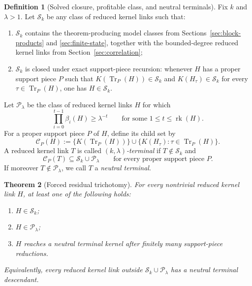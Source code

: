 \documentclass[11pt]{article}
\newtheorem{theorem}{Theorem}[section]
\theoremstyle{definition}
\newtheorem{definition}[theorem]{Definition}
\newcommand{\Tr}{\operatorname{Tr}}
\newcommand{\rank}{\operatorname{rk}}
\newcommand{\1}{\mathbf{1}}
\begin{document}
\begin{definition}[Solved closure, profitable class, and neutral terminals]\label{def:neutral-terminal}
Fix $k$ and $\lambda>1$. Let $\mathcal S_k$ be any class of reduced kernel links such that:
\begin{enumerate}[label=(\roman*),leftmargin=2.2em]
\item $\mathcal S_k$ contains the theorem-producing model classes from Sections~\ref{sec:block-products} and \ref{sec:finite-state}, together with the bounded-degree reduced kernel links from Section~\ref{sec:correlation};
\item $\mathcal S_k$ is closed under exact support-piece recursion: whenever $H$ has a proper support piece $P$ such that $K(\Tr_P(H))\in \mathcal S_k$ and $K(H_\tau)\in \mathcal S_k$ for every $\tau\in \Tr_P(H)$, one has $H\in \mathcal S_k$.
\end{enumerate}
Let $\mathcal P_\lambda$ be the class of reduced kernel links $H$ for which
\[
\prod_{i=0}^{t-1}\beta_i(H)\ge \lambda^{-t}
\qquad\text{for some }1\le t\le \rank(H).
\]
For a proper support piece $P$ of $H$, define its child set by
\[
\mathcal C_P(H):=\{K(\Tr_P(H))\}\cup \{K(H_\tau):\tau\in \Tr_P(H)\}.
\]
A reduced kernel link $T$ is called \emph{$(k,\lambda)$-terminal} if $T\notin \mathcal S_k$ and
\[
\mathcal C_P(T)\subseteq \mathcal S_k\cup \mathcal P_\lambda
\qquad\text{for every proper support piece }P.
\]
If moreover $T\notin \mathcal P_\lambda$, we call $T$ a \emph{neutral terminal}.
\end{definition}

\begin{theorem}[Forced residual trichotomy]\label{thm:forced-trichotomy}
For every nontrivial reduced kernel link $H$, at least one of the following holds:
\begin{enumerate}[label=(\roman*),leftmargin=2.2em]
\item $H\in \mathcal S_k$;
\item $H\in \mathcal P_\lambda$;
\item $H$ reaches a neutral terminal kernel after finitely many support-piece reductions.
\end{enumerate}
Equivalently, every reduced kernel link outside $\mathcal S_k\cup \mathcal P_\lambda$ has a neutral terminal descendant.
\end{theorem}
\end{document}
